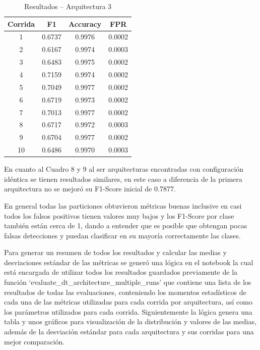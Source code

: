 \documentclass[12pt,a4paper]{article}
\begin{document}
\begin{table}[H]
  \centering
  \begin{tabular}{c c c c}
    \hline
    Corrida & F1 & Accuracy & FPR \\
    \hline
    1  & 0.6737 & 0.9976 & 0.0002 \\
    2  & 0.6167 & 0.9974 & 0.0003 \\
    3  & 0.6483 & 0.9975 & 0.0002 \\
    4  & 0.7159 & 0.9974 & 0.0002 \\
    5  & 0.7049 & 0.9977 & 0.0002 \\
    6  & 0.6719 & 0.9973 & 0.0002 \\
    7  & 0.7013 & 0.9977 & 0.0002 \\
    8  & 0.6717 & 0.9972 & 0.0003 \\
    9  & 0.6704 & 0.9977 & 0.0002 \\
    10 & 0.6486 & 0.9970 & 0.0003 \\
    \hline
  \end{tabular}
  \caption{Resultados – Arquitectura 3}
  \label{tab:corridas_arq3}
\end{table}

En cuanto al Cuadro 8 y 9 al ser arquitecturas encontradas con configuración idéntica se tienen resultados similares,
en este caso a diferencia de la primera arquitectura no se mejoró su F1-Score inicial de 0.7877.

En general todas las particiones obtuvieron métricas buenas inclusive en casi todos los falsos positivos tienen valores
muy bajos y los F1-Score por clase también están cerca de 1, dando a entender que es posible que obtengan
pocas falsas detecciones y puedan clasificar en su mayoría correctamente las clases.

Para generar un resumen de todos los resultados y calcular las medias y desviaciones estándar de las métricas se generó una lógica
en el notebook la cual está encargada de utilizar todos los resultados guardados previamente de la función `evaluate_dt_architecture_multiple_runs'
que contiene una lista de los resultados de todas las evaluaciones, conteniendo los momentos estadísticos de
cada una de las métricas utilizadas para cada corrida por arquitectura, así como los parámetros utilizados para cada corrida.
Siguientemente la lógica genera una tabla y unos gráficos para visualización de la distribución y valores de las medias, además de la desviación estándar
para cada arquitectura y sus corridas para una mejor comparación.
\end{document}
